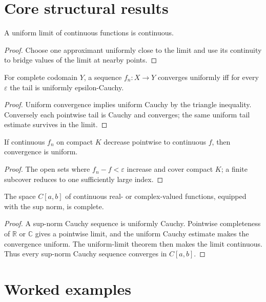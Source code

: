\section{Core structural results}

\begin{theorem}\label{thm:ii11-01}
A uniform limit of continuous functions is continuous.
\begin{proof}
Choose one approximant uniformly close to the limit and use its continuity to bridge values of the limit at nearby points.
\end{proof}
\end{theorem}

\begin{theorem}\label{thm:ii11-02}
For complete codomain $Y$, a sequence $f_n:X\to Y$ converges uniformly iff for every $\varepsilon$ the tail is uniformly epsilon-Cauchy.
\begin{proof}
Uniform convergence implies uniform Cauchy by the triangle inequality. Conversely each pointwise tail is Cauchy and converges; the same uniform tail estimate survives in the limit.
\end{proof}
\end{theorem}

\begin{theorem}\label{thm:ii11-03}
If continuous $f_n$ on compact $K$ decrease pointwise to continuous $f$, then convergence is uniform.
\begin{proof}
The open sets where $f_n-f<\varepsilon$ increase and cover compact $K$; a finite subcover reduces to one sufficiently large index.
\end{proof}
\end{theorem}

\begin{theorem}\label{thm:ii11-04}
The space $C[a,b]$ of continuous real- or complex-valued functions, equipped with the sup norm, is complete.
\begin{proof}
A sup-norm Cauchy sequence is uniformly Cauchy. Pointwise completeness of $\mathbb R$ or $\mathbb C$ gives a pointwise limit, and the uniform Cauchy estimate makes the convergence uniform. The uniform-limit theorem then makes the limit continuous. Thus every sup-norm Cauchy sequence converges in $C[a,b]$.
\end{proof}
\end{theorem}

\section{Worked examples}

